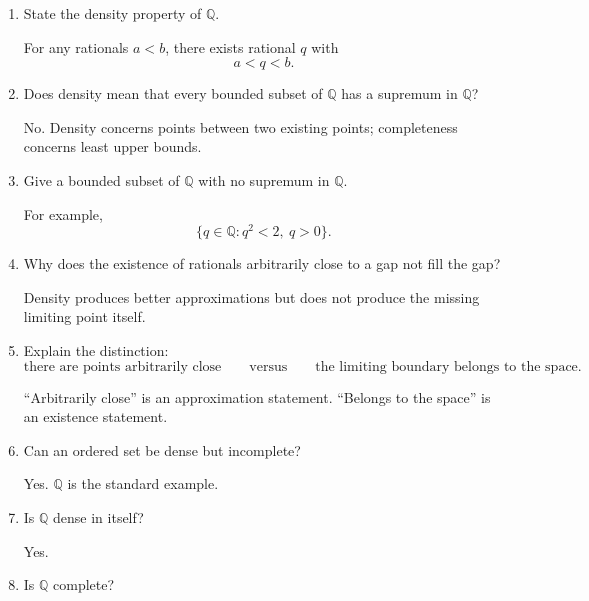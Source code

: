 \documentclass{self-check}
\begin{document}
\begin{enumerate}[label=\arabic{*}., itemsep=10pt]
  \item State the density property of \(\mathbb{Q}\).

    \begin{answer}
      For any rationals \(a<b\), there exists rational \(q\) with
      \[ a<q<b. \]
    \end{answer}
  \item Does density mean that every bounded subset of \(\mathbb{Q}\) has a supremum in \(\mathbb{Q}\)?

    \begin{answer}
      No. Density concerns points between two existing points; completeness concerns least upper bounds.
    \end{answer}
  \item Give a bounded subset of \(\mathbb{Q}\) with no supremum in \(\mathbb{Q}\).

    \begin{answer}
      For example,
      \[ \{q\in\mathbb{Q}:q^{2}<2,\ q>0\}. \]
    \end{answer}
  \item Why does the existence of rationals arbitrarily close to a gap not fill the gap?

    \begin{answer}
      Density produces better approximations but does not produce the missing limiting point itself.
    \end{answer}
  \item Explain the distinction:
    \[ \text{there are points arbitrarily close}\qquad\text{versus}\qquad \text{the limiting boundary belongs to the space}. \]

    \begin{answer}
      ``Arbitrarily close'' is an approximation statement. ``Belongs to the space'' is an existence statement.
    \end{answer}
  \item Can an ordered set be dense but incomplete?

    \begin{answer}
      Yes. \(\mathbb{Q}\) is the standard example.
    \end{answer}
  \item Is \(\mathbb{Q}\) dense in itself?

    \begin{answer}
      Yes.
    \end{answer}
  \item Is \(\mathbb{Q}\) complete?


\end{enumerate}
\end{document}
